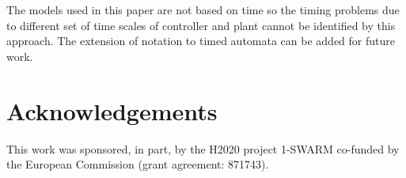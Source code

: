 \begin{bibunit}
The models used in this paper are not based on time so the timing problems due to different set of time scales of controller and plant cannot be identified by this approach. The extension of notation to timed automata can be added for future work.

\section{Acknowledgements}
This work was sponsored, in part, by the H2020 project 1-SWARM co-funded by the European Commission (grant agreement: 871743).  

\putbib
\end{bibunit}
